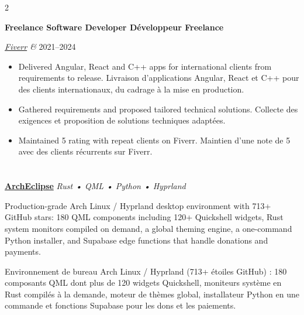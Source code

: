 \documentclass[10pt,a4paper]{article}
\newcommand{\ghstar}{\textcolor{accent!65}{\faStar}}
\providecommand{\archEclipseStars}{713}
\begin{document}
\begin{paracol}{2}
\vspace{0.7em}


\textbf{
{Freelance Software Developer}
{Développeur Freelance}
}

\textit{\href{https://www.fiverr.com/animfoxy}{Fiverr} \& }
\hfill
2021--2024



\begin{itemize}
\item {}
{Delivered Angular, React and C++ apps for international clients from requirements to release. }{Livraison d'applications Angular, React et C++ pour des clients internationaux, du cadrage à la mise en production.}
\item {}
{Gathered requirements and proposed tailored technical solutions. }{Collecte des exigences et proposition de solutions techniques adaptées.}
\item {}
{Maintained 5\ghstar{} rating with repeat clients on Fiverr. }{Maintien d'une note de 5\ghstar{} avec des clients récurrents sur Fiverr.}
\end{itemize}



\section*{}

\textbf{
\href{https://github.com/AymanLyesri/ArchEclipse}
{ArchEclipse}
}
\hfill
\textit{Rust • QML • Python • Hyprland}

\smallskip

{

Production-grade Arch Linux / Hyprland desktop environment with
\archEclipseStars+\ghstar{} GitHub stars: 180 QML components including
120+ Quickshell widgets, Rust system monitors compiled on demand,
a global theming engine, a one-command Python installer, and Supabase
edge functions that handle donations and payments.

}
{Environnement de bureau Arch Linux / Hyprland (\archEclipseStars+\ghstar{} étoiles GitHub) : 180 composants QML dont plus de 120 widgets Quickshell, moniteurs système en Rust compilés à la demande, moteur de thèmes global, installateur Python en une commande et fonctions Supabase pour les dons et les paiements.}


\end{paracol}
\end{document}
